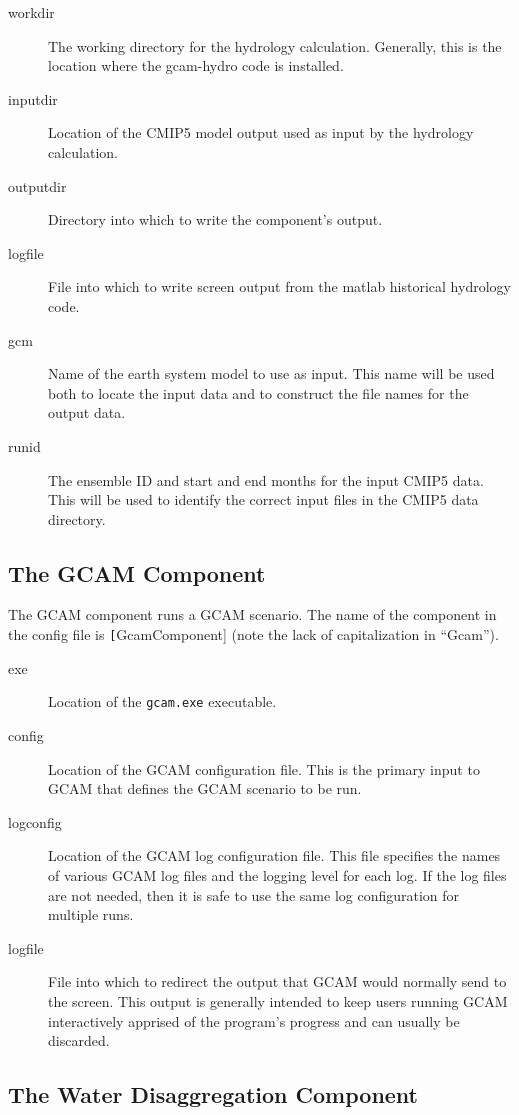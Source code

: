 \documentclass[11pt]{article}
\begin{document}
\begin{description}
\item[workdir] The working directory for the hydrology calculation.
  Generally, this is the location where the gcam-hydro code is
  installed.
\item[inputdir] Location of the CMIP5 model output used as input by
  the hydrology calculation.
\item[outputdir] Directory into which to write the component's output.
\item[logfile] File into which to write screen output from the
  matlab historical hydrology code.
\item[gcm] Name of the earth system model to use as input.  This
  name will be used both to locate the input data and to construct
  the file names for the output data.
\item[runid] The ensemble ID and start and end months for the input
  CMIP5 data.  This will be used to identify the correct input files
  in the CMIP5 data directory.
\end{description}

\subsection{The {GCAM} Component}
The GCAM component runs a GCAM scenario.  The name of the component in the
config file is \texttt[GcamComponent] (note the lack of capitalization in
``Gcam'').

\begin{description}
\item[exe] Location of the \texttt{gcam.exe} executable.
\item[config] Location of the GCAM configuration file.  This is the
  primary input to GCAM that defines the GCAM scenario to be run.
\item[logconfig] Location of the GCAM log configuration file.  This
  file specifies the names of various GCAM log files and the logging
  level for each log.  If the log files are not needed, then it is
  safe to use the same log configuration for multiple runs.
\item[logfile] File into which to redirect the output that GCAM would
  normally send to the screen.  This output is generally intended to
  keep users running GCAM interactively apprised of the program's
  progress and can usually be discarded.
\end{description}

\subsection{The Water Disaggregation Component}
\end{document}

